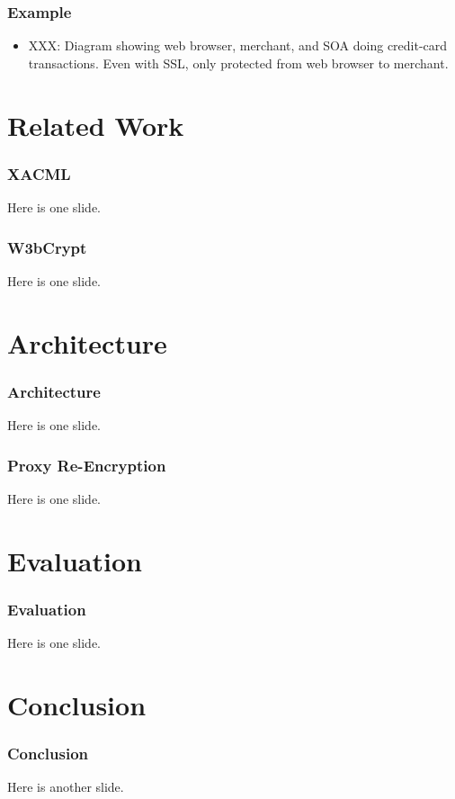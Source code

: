 \documentclass{beamer}
\begin{document}
\begin{frame}
\frametitle{Example}
\begin{itemize}
\item XXX: Diagram showing web browser, merchant, and SOA doing credit-card
transactions.  Even with SSL, only protected from web browser to merchant.
\end{itemize}
\end{frame}

\section{Related Work}


\begin{frame}
\frametitle{XACML}
Here is one slide.
\end{frame}

\begin{frame}
\frametitle{W3bCrypt}
Here is one slide.
\end{frame}

\section{Architecture}
\begin{frame}
\frametitle{Architecture}
Here is one slide.
\end{frame}

\begin{frame}
\frametitle{Proxy Re-Encryption}
Here is one slide.
\end{frame}

\section{Evaluation}
\begin{frame}
\frametitle{Evaluation}
Here is one slide.
\end{frame}

\section{Conclusion}
\begin{frame}
\frametitle{Conclusion}
Here is another slide.
\end{frame}
\end{document}
